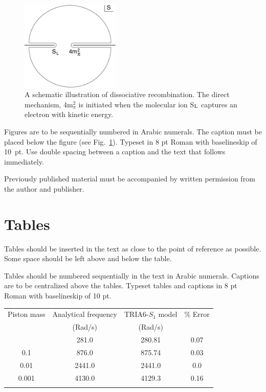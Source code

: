 \documentclass{ws-ijmpc}
\begin{document}
\begin{figure}[ph]
\centerline{\includegraphics[width=4.7cm]{ijmpcf1}}
\vspace*{8pt}
\caption{A schematic illustration of dissociative recombination. The
direct mechanism, 4m$^2_\pi$ is initiated when the
molecular ion S$_{\rm L}$ captures an electron with
kinetic energy. \label{f1}}
\end{figure}

Figures are to be sequentially numbered in Arabic numerals. The
caption must be placed below the figure (see Fig.~\ref{f1}). Typeset
in 8 pt Roman with baselineskip of 10~pt. Use double spacing
between a caption and the text that follows immediately.

Previously published material must be accompanied by written
permission from the author and publisher.

\section{Tables}

Tables should be inserted in the text as close to the point of
reference as possible. Some space should be left above and below
the table.

Tables should be numbered sequentially in the text in Arabic
numerals. Captions are to be centralized above the tables.
Typeset tables and captions in 8 pt Roman with
baselineskip of 10 pt.

\begin{table}[ht]
{\begin{tabular}{@{}cccc@{}} \toprule
Piston mass & Analytical frequency & TRIA6-$S_1$ model &
\% Error \\
& (Rad/s) & (Rad/s) \\ \colrule
1.0\hphantom{00} & \hphantom{0}281.0 & \hphantom{0}280.81 & 0.07 \\
0.1\hphantom{00} & \hphantom{0}876.0 & \hphantom{0}875.74 & 0.03 \\
0.01\hphantom{0} & 2441.0 & 2441.0\hphantom{0} & 0.0\hphantom{0} \\
0.001 & 4130.0 & 4129.3\hphantom{0} & 0.16\\ \botrule
\end{tabular} \label{ta1}}
\end{table}
\end{document}
